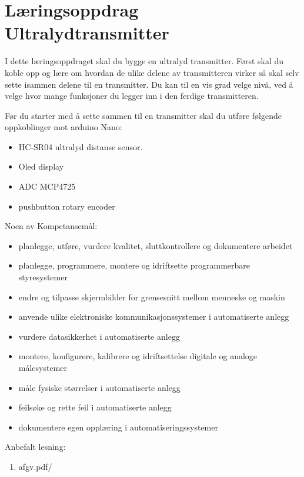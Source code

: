 
\noindent
\section*{Læringsoppdrag Ultralydtransmitter}

\vskip 5pt
I dette læringsoppdraget skal du bygge en ultralyd transmitter. Først skal du koble opp og lære om hvordan de ulike delene av transmitteren virker så skal selv sette isammen delene til en transmitter. Du kan til en vis grad velge nivå, ved å velge hvor mange funksjoner du legger inn i den ferdige transmitteren. 

Før du  starter med å sette sammen til en transmitter skal du utføre følgende oppkoblinger mot arduino Nano:
\begin{itemize}[noitemsep]
	\item HC-SR04 ultralyd distanse sensor. 
	\item Oled display
	\item ADC MCP4725
	\item pushbutton rotary encoder
\end{itemize}


\vskip 2.5pt 
Noen av 
Kompetansemål:
\begin{itemize}[noitemsep]

	\item planlegge, utføre, vurdere kvalitet, sluttkontrollere og dokumentere arbeidet
	\item planlegge, programmere, montere og idriftsette programmerbare styresystemer
	\item endre og tilpasse skjermbilder for grensesnitt mellom menneske og maskin
	\item anvende ulike elektroniske kommunikasjonssystemer i automatiserte anlegg
	\item vurdere datasikkerhet i automatiserte anlegg
	\item montere, konfigurere, kalibrere og idriftsettelse digitale og analoge målesystemer
	\item måle fysiske størrelser i automatiserte anlegg
	\item feilsøke og rette feil i automatiserte anlegg
	\item dokumentere egen opplæring i automatiseringssystemer
\end{itemize}

Anbefalt lesning:

\begin{enumerate}
	\item afgv.pdf/ 
\end{enumerate}


